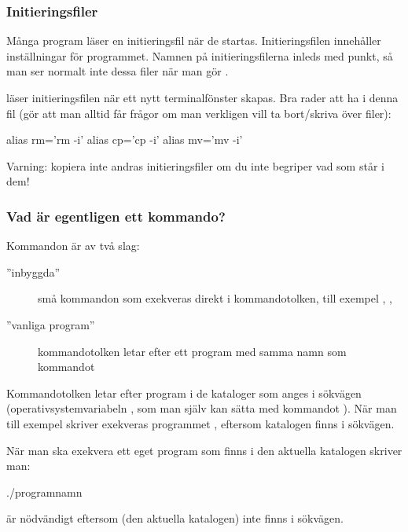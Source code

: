 \begin{frame}[fragile=singleslide]
\frametitle{Initieringsfiler}
Många program läser en initieringsfil när de startas. Initieringsfilen innehåller inställningar för programmet. Namnen på initieringsfilerna inleds med punkt, så man ser normalt inte dessa filer när man gör .

\pindent {} läser initieringsfilen  när ett nytt terminalfönster skapas. Bra rader att ha i denna fil (gör att man alltid får frågor om man verkligen vill ta bort/skriva över filer):

\begin{Code}
alias rm='rm -i'
alias cp='cp -i'
alias mv='mv -i'
\end{Code}

Varning: kopiera inte andras initieringsfiler om du inte begriper vad som står i dem!
\end{frame} 

\begin{frame}[fragile=singleslide]
\frametitle{Vad är egentligen ett kommando?}
Kommandon är av två slag:

\begin{description}
\item[''inbyggda''] små kommandon som exekveras direkt i kommandotolken, till exempel , , 
\item[''vanliga program''] kommandotolken letar efter ett program med samma namn som kommandot
\end{description}

Kommandotolken letar efter program i de kataloger som anges i sökvägen (operativsystemvariabeln , som man själv kan sätta med kommandot ). När man till exempel skriver  exekveras programmet , eftersom katalogen  finns i sökvägen.

\pindent När man ska exekvera ett eget program som finns i den aktuella katalogen skriver man:
\begin{Code}
./programnamn
\end{Code}

 är nödvändigt eftersom  (den aktuella katalogen) inte finns i sökvägen.
\end{frame} 

